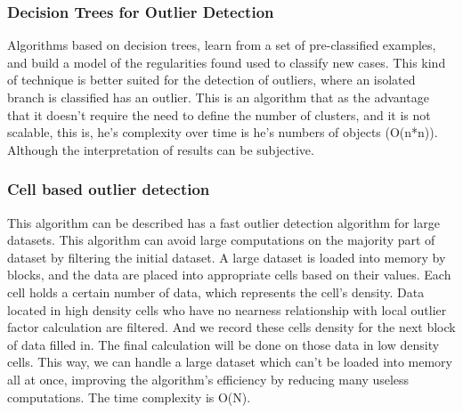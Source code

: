 \documentclass{llncs}
\begin{document}
\subsubsection{Decision Trees for Outlier Detection}
Algorithms based on decision trees, learn from a set of pre-classified examples, and build a model of the regularities found used to classify new cases.
This kind of technique is better suited for the detection of outliers, where an isolated branch is classified has an outlier.
This is an algorithm that as the advantage that it doesn't require the need to define the number of clusters, and it is not scalable, this is, he's complexity over time is he's numbers of objects (O(n*n)). Although the interpretation of results can be subjective.

\subsubsection{Cell based outlier detection}
This algorithm can be described has a fast outlier detection algorithm for large datasets. This algorithm can avoid large computations on the majority part of dataset by filtering the initial dataset.
A large dataset is loaded into memory by blocks, and the data are placed into appropriate cells based on their values. Each cell holds a certain number of data, which represents the cell's density. Data located in high density cells who have no nearness relationship with local outlier factor calculation are filtered. And we record these cells density for the next block of data filled in. The final calculation will be done on those data in low density cells. This way, we can handle a large dataset which can't be loaded into memory all at once, improving the algorithm's efficiency by reducing many useless computations. The time complexity is O(N).

\begin{thebibliography}{9}

\end{thebibliography}
\end{document}
